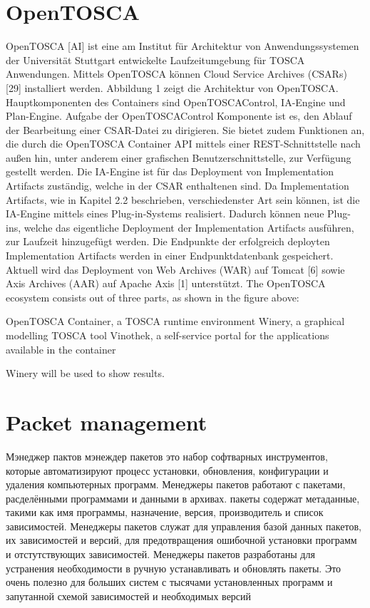 \section{OpenTOSCA} \label{sec:opentosca}
OpenTOSCA [AI] ist eine am Institut für Architektur von Anwendungssystemen der Universität
Stuttgart entwickelte Laufzeitumgebung für TOSCA Anwendungen.
Mittels OpenTOSCA können Cloud Service Archives (CSARs) [29] installiert
werden.
Abbildung 1 zeigt die Architektur von OpenTOSCA. Hauptkomponenten des
Containers sind OpenTOSCAControl, IA-Engine und Plan-Engine.
Aufgabe der OpenTOSCAControl Komponente ist es, den Ablauf der Bearbeitung
einer CSAR-Datei zu dirigieren. Sie bietet zudem Funktionen an, die durch
die OpenTOSCA Container API mittels einer REST-Schnittstelle nach außen hin,
unter anderem einer grafischen Benutzerschnittstelle, zur Verfügung gestellt
werden.
Die IA-Engine ist für das Deployment von Implementation Artifacts
zuständig, welche in der CSAR enthaltenen sind. Da Implementation
Artifacts, wie in Kapitel 2.2 beschrieben, verschiedenster Art sein können,
ist die IA-Engine mittels eines Plug-in-Systems realisiert. Dadurch können neue
Plug-ins, welche das eigentliche Deployment der Implementation
Artifacts ausführen, zur Laufzeit hinzugefügt werden. Die Endpunkte der
erfolgreich deployten Implementation Artifacts werden in einer Endpunktdatenbank
gespeichert. Aktuell wird das Deployment von Web Archives
(WAR) auf Tomcat [6] sowie Axis Archives (AAR) auf Apache Axis [1] unterstützt.
The OpenTOSCA ecosystem consists out of three parts, as shown in the figure above:

OpenTOSCA Container, a TOSCA runtime environment
Winery, a graphical modelling TOSCA tool
Vinothek, a self-service portal for the applications available in the container

Winery will be used to show results.
\section{Packet management} \label{sec:pm}

Мэнеджер пактов
мэнеждер пакетов это набор софтварных инструментов, которые автоматизируют процесс установки, обновления, конфигурации и удаления компьютерных программ. 
Менеджеры пакетов работают с пакетами, расделёнными программами и данными в архивах. пакеты содержат метаданные, такими как имя программы, назначение, версия, производитель и список зависимостей. 
Менеджеры пакетов служат для управления базой данных пакетов, их зависимостей и версий, для предотвращения ошибочной установки программ и отстутствующих зависимостей. 
Менеджеры пакетов разработаны для устранения необходимости в ручную устанавливать и обновлять пакеты. Это очень полезно для больших систем с тысячами установленных программ и запутанной схемой зависимостей и необходимых версий

